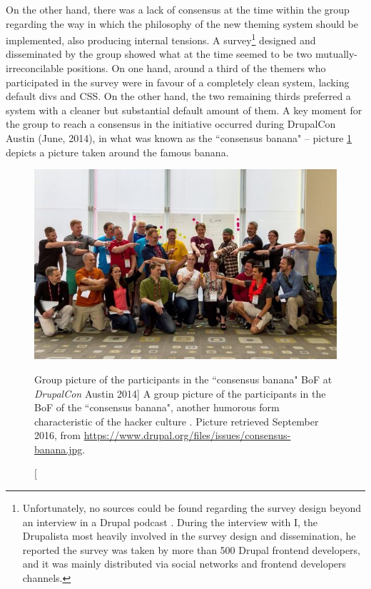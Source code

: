 On the other hand, there was a lack of consensus at the time within the group regarding the way in which the philosophy of the new theming system should be implemented, also producing internal tensions. A survey\footnote{Unfortunately, no sources could be found regarding the survey design beyond an interview in a Drupal podcast \parencite{twig-morten-interview:Online}. During the interview with I, the Drupalista most heavily involved in the survey design and dissemination, he reported the survey was taken by more than 500 Drupal frontend developers, and it was mainly distributed via social networks and frontend developers channels.} designed and disseminated by the group showed what at the time seemed to be two mutually-irreconcilable positions. On one hand, around a third of the themers who participated in the survey were in favour of a completely clean system, lacking default divs and CSS. On the other hand, the two remaining thirds preferred a system with a cleaner but substantial default amount of them.  A key moment for the group to reach a consensus in the initiative occurred during DrupalCon Austin (June, 2014), in what was known as the ``consensus banana" -- picture \ref{consensus-banana} depicts a picture taken around the famous banana.

\begin{figure}[H]
\centering
\includegraphics[scale=0.6]{img/polycentric/consensus-banana.jpg}
\caption[Group picture of the participants in the ``consensus banana" BoF at \textit{DrupalCon} Austin 2014]%
{A group picture of the participants in the BoF of the ``consensus banana", another humorous form characteristic of the hacker culture \textcite{coleman2013coding}. Picture retrieved  September 2016, from \url{https://www.drupal.org/files/issues/consensus-banana.jpg}.}
\label{consensus-banana}
\end{figure}

